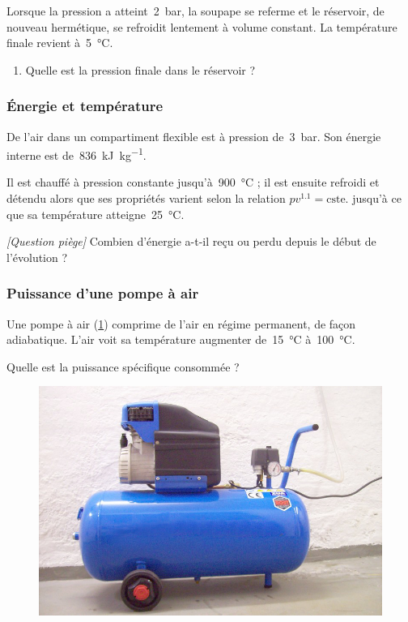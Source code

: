 	Lorsque la pression a atteint~\SI{2}{\bar}, la soupape se referme et le réservoir, de nouveau hermétique, se refroidit lentement à volume constant. La température finale revient à~\SI{5}{\degreeCelsius}.
	
	\begin{enumerate}
		\item Quelle est la pression finale dans le réservoir ?
	\end{enumerate}


\subsubsection{Énergie et température}
\label{exo_gp_energie_temperature}

	De l’air dans un compartiment flexible est à pression de~\SI{3}{\bar}. Son énergie interne est de~\SI{836}{\kilo\joule\per\kilogram}.
	
	Il est chauffé à pression constante jusqu’à~\SI{900}{\degreeCelsius} ; il est ensuite refroidi et détendu alors que ses propriétés varient selon la relation $p v^{\num{1.1}} = \text{cste.}$ jusqu’à ce que sa température atteigne~\SI{25}{\degreeCelsius}.

	\textit{[Question piège]} Combien d’énergie a-t-il reçu ou perdu depuis le début de l’évolution ?

\subsubsection{Puissance d’une pompe à air}
\label{exo_puissance_pompe_air}

	Une pompe à air (\cref{fig_exo_compresseur_air}) comprime de l’air en régime permanent, de façon adiabatique. L’air voit sa température augmenter de~\SI{15}{\degreeCelsius} à~\SI{100}{\degreeCelsius}.
	
	Quelle est la puissance spécifique consommée ?

	\begin{figure}[!bh]
		\begin{center}
			\onlyframabook{\vspace{-0.3cm}}%
			\includegraphics[width=0.6\columnwidth]{images/compresseur_air_reservoir.jpg}
			\onlyframabook{\vspace{-0.6cm}}%
		\end{center}
		\label{fig_exo_compresseur_air}
	\end{figure}

